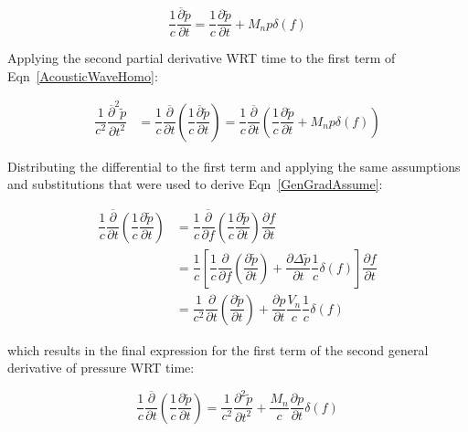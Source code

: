 \documentclass[]{aiaa-tc}%
\begin{document}
\begin{equation} \label{GenTimeP}
\dfrac{1}{c}\dfrac{\overline{\partial}\widetilde{p}}{\partial t}
= \dfrac{1}{c}\dfrac{\partial\widetilde{p}}{\partial t}
    + M_n p\delta(f)
\end{equation}

Applying the second partial derivative WRT time to the first term of Eqn~\ref{AcousticWaveHomo}:

\begin{align*}
\dfrac{1}{c^2}\dfrac{\overline{\partial}^2\widetilde{p}}{\partial t^2}
    &= \dfrac{1}{c}\dfrac{\overline{\partial}}{\partial t} \left(
    \dfrac{1}{c}\dfrac{\overline{\partial}\widetilde{p}}{\partial t} \right)
= \dfrac{1}{c}\dfrac{\overline{\partial}}{\partial t} \left(
\dfrac{1}{c}\dfrac{\partial\widetilde{p}}{\partial t}
    + M_n p\delta(f) \right)
\end{align*}

\noindent Distributing the differential to the first term and applying the same assumptions and substitutions that were used to derive Eqn~\ref{GenGradAssume}:

\begin{align*}
\dfrac{1}{c}\dfrac{\overline{\partial}}{\partial t}
    \left( \dfrac{1}{c}\dfrac{\partial\widetilde{p}}{\partial t} \right)
    &= \dfrac{1}{c}\dfrac{\overline{\partial}}{\partial f}
    \left( \dfrac{1}{c}\dfrac{\partial\widetilde{p}}{\partial t} \right)
    \dfrac{\partial f}{\partial t} \\
&= \dfrac{1}{c} \left[
    \dfrac{1}{c} \dfrac{\partial}{\partial f} \left(
    \dfrac{\partial\widetilde{p}}{\partial t} \right)
    + \dfrac{\partial\Delta\widetilde{p}}{\partial t} \dfrac{1}{c}\delta(f)
    \right] \dfrac{\partial f}{\partial t} \\
&=  \dfrac{1}{c^2} \dfrac{\partial}{\partial t} \left(
    \dfrac{\partial\widetilde{p}}{\partial t} \right)
    + \dfrac{\partial p}{\partial t} \dfrac{V_n}{c} \dfrac{1}{c}\delta(f)
\end{align*}

\noindent which results in the final expression for the first term of the second general derivative of pressure WRT time:

\begin{equation} \label{2ndDerTerm1}
\dfrac{1}{c}\dfrac{\overline{\partial}}{\partial t}
    \left( \dfrac{1}{c}\dfrac{\partial\widetilde{p}}{\partial t} \right)
=  \dfrac{1}{c^2} \dfrac{\partial^2\widetilde{p}}{\partial t^2}
    + \dfrac{M_n}{c} \dfrac{\partial p}{\partial t}  \delta(f)
\end{equation}
\end{document}
